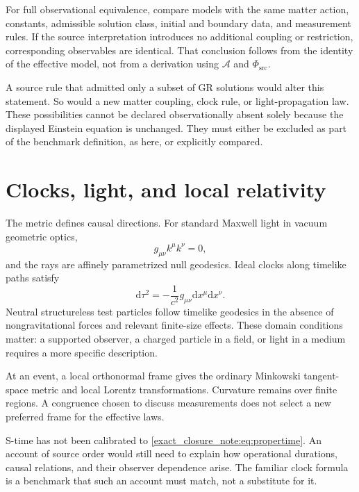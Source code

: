 \documentclass[11pt,oneside]{report}
\newcommand{\Sub}{\mathcal A}
\newcommand{\PhiSrc}{\Phi_{\mathrm{src}}}
\newcommand{\dd}{\mathrm d}
\theoremstyle{remark}
\numberwithin{definition}{chapter}
\numberwithin{proposition}{chapter}
\numberwithin{remark}{chapter}
\begin{document}
For full observational equivalence, compare models with the same matter action, constants, admissible solution class, initial and boundary data, and measurement rules. If the source interpretation introduces no additional coupling or restriction, corresponding observables are identical. That conclusion follows from the identity of the effective model, not from a derivation using $\Sub$ and $\PhiSrc$.

A source rule that admitted only a subset of GR solutions would alter this statement. So would a new matter coupling, clock rule, or light-propagation law. These possibilities cannot be declared observationally absent solely because the displayed Einstein equation is unchanged. They must either be excluded as part of the benchmark definition, as here, or explicitly compared.

\section{Clocks, light, and local relativity}
The metric defines causal directions. For standard Maxwell light in vacuum geometric optics,
\begin{equation}
g_{\mu\nu}k^\mu k^\nu=0,
\label{exact_closure_note:eq:null}
\end{equation}
and the rays are affinely parametrized null geodesics. Ideal clocks along timelike paths satisfy
\begin{equation}
\dd\tau^2=-\frac1{c^2}g_{\mu\nu}\dd x^\mu\dd x^\nu.
\label{exact_closure_note:eq:propertime}
\end{equation}
Neutral structureless test particles follow timelike geodesics in the absence of nongravitational forces and relevant finite-size effects. These domain conditions matter: a supported observer, a charged particle in a field, or light in a medium requires a more specific description.

At an event, a local orthonormal frame gives the ordinary Minkowski tangent-space metric and local Lorentz transformations. Curvature remains over finite regions. A congruence chosen to discuss measurements does not select a new preferred frame for the effective laws.

S-time has not been calibrated to \eqref{exact_closure_note:eq:propertime}. An account of source order would still need to explain how operational durations, causal relations, and their observer dependence arise. The familiar clock formula is a benchmark that such an account must match, not a substitute for it.
\end{document}
